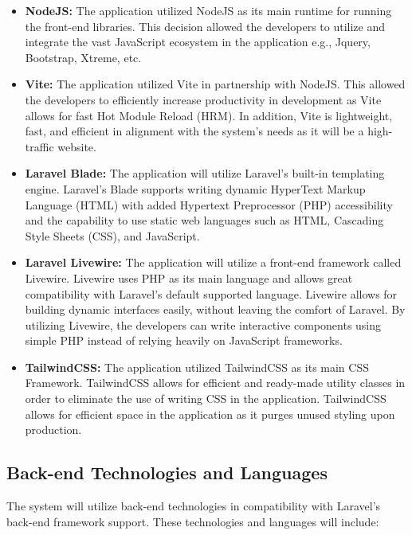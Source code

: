     \begin{itemize}
        \item[] \textbf{NodeJS:} The application utilized NodeJS as its main runtime for running the front-end libraries. This decision allowed the developers to utilize and integrate the vast JavaScript ecosystem in the application e.g., Jquery, Bootstrap, Xtreme, etc.
        \item[] \textbf{Vite:} The application utilized Vite in partnership with NodeJS. This allowed the developers to efficiently increase productivity in development as Vite allows for fast Hot Module Reload (HRM). In addition, Vite is lightweight, fast, and efficient in alignment with the system's needs as it will be a high-traffic website.
        \item[] \textbf{Laravel Blade:} The application will utilize Laravel's built-in templating engine. Laravel's Blade supports writing dynamic HyperText Markup Language (HTML) with added Hypertext Preprocessor (PHP) accessibility and the capability to use static web languages such as HTML, Cascading Style Sheets (CSS), and JavaScript.
        \item[] \textbf{Laravel Livewire:} The application will utilize a front-end framework called Livewire. Livewire uses PHP as its main language and allows great compatibility with Laravel's default supported language. Livewire allows for building dynamic interfaces easily, without leaving the comfort of Laravel. By utilizing Livewire, the developers can write interactive components using simple PHP instead of relying heavily on JavaScript frameworks.
        \item[] \textbf{TailwindCSS:} The application utilized TailwindCSS as its main CSS Framework. TailwindCSS allows for efficient and ready-made utility classes in order to eliminate the use of writing CSS in the application. TailwindCSS allows for efficient space in the application as it purges unused styling upon production.
    \end{itemize}

\subsection{Back-end Technologies and Languages}
    The system will utilize back-end technologies in compatibility with Laravel's back-end framework support. These technologies and languages will include:
    

